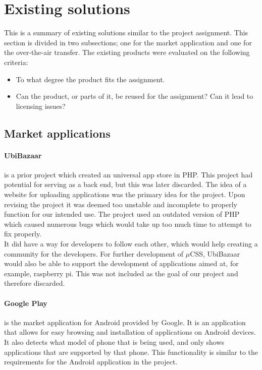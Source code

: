 \section{Existing solutions}
This is a summary of existing solutions similar to the project assignment. This section is divided in two subsections; one for the market application and one for the over-the-air transfer. The existing products were evaluated on the following criteria:
\begin{itemize}
	\item{To what degree the product fits the assignment.}
	\item{Can the product, or parts of it, be reused for the assignment? Can it lead to licensing issues?}
\end{itemize}

\subsection{Market applications}
\paragraph{UbiBazaar} is a prior project which created an universal app store in PHP. This project had potential for serving as a back end, but this was later discarded. The idea of a website for uploading applications was the primary idea for the project. Upon revising the project it was deemed too unstable and incomplete to properly function for our intended use. The project used an outdated version of PHP which caused numerous bugs which would take up too much time to attempt to fix properly.\\

It did have a way for developers to follow each other, which would help creating a community for the developers. For further development of $\mu$CSS, UbiBazaar would also be able to support the development of applications aimed at, for example, raspberry pi. This was not included as the goal of our project and therefore discarded.

\paragraph{Google Play} is the market application for Android provided by Google. It is an application that allows for easy browsing and installation of applications on Android devices. It also detects what model of phone that is being used, and only shows applications that are supported by that phone. This functionality is similar to the requirements for the Android application in the project.

